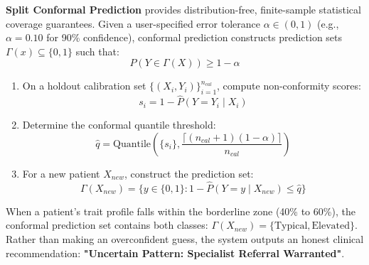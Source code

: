 \documentclass[journal]{IEEEtran}
\begin{document}
\textbf{Split Conformal Prediction} \cite{vovk2005algorithmic, angelopoulos2021gentle} provides distribution-free, finite-sample statistical coverage guarantees. Given a user-specified error tolerance $\alpha \in (0, 1)$ (e.g., $\alpha = 0.10$ for 90\% confidence), conformal prediction constructs prediction sets $\Gamma(x) \subseteq \{0, 1\}$ such that:
\begin{equation}
P(Y \in \Gamma(X)) \ge 1 - \alpha
\end{equation}
\begin{enumerate}
    \item On a holdout calibration set $\{(X_i, Y_i)\}_{i=1}^{n_{cal}}$, compute non-conformity scores:
    \begin{equation}
    s_i = 1 - \hat{P}(Y = Y_i \mid X_i)
    \end{equation}
    \item Determine the conformal quantile threshold:
    \begin{equation}
    \hat{q} = \text{Quantile}\left(\{s_i\}, \frac{\lceil(n_{cal} + 1)(1 - \alpha)\rceil}{n_{cal}}\right)
    \end{equation}
    \item For a new patient $X_{new}$, construct the prediction set:
    \begin{equation}
    \Gamma(X_{new}) = \{y \in \{0, 1\} : 1 - \hat{P}(Y = y \mid X_{new}) \le \hat{q}\}
    \end{equation}
\end{enumerate}
When a patient's trait profile falls within the borderline zone (40\% to 60\%), the conformal prediction set contains both classes: $\Gamma(X_{new}) = \{\text{Typical}, \text{Elevated}\}$. Rather than making an overconfident guess, the system outputs an honest clinical recommendation: \textbf{"Uncertain Pattern: Specialist Referral Warranted"}.
\end{document}

